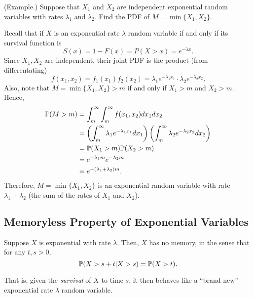 \documentclass[letterpaper]{article}
\begin{document}
\begin{mdframed}[]
    (Example.) Suppose that $X_1$ and $X_2$ are independent exponential random variables with rates $\lambda_1$ and $\lambda_2$. Find the PDF of $M = \min\{X_1, X_2\}$. 

    \begin{mdframed}[]
        Recall that if $X$ is an exponential rate $\lambda$ random variable if and only if its survival function is 
        \[S(x) = 1 - F(x) = P(X > x) = e^{-\lambda x}.\]
        Since $X_1, X_2$ are independent, their joint PDF is the product (from differentating)
        \[f(x_1, x_2) = f_{1}(x_1) f_{2}(x_2) = \lambda_1 e^{-\lambda_1 x_1} \cdot \lambda_2 e^{-\lambda_2 x_2}.\]
        Also, note that $M = \min\{X_1, X_2\} > m$ if and only if $X_1 > m$ and $X_2 > m$. Hence,
        \begin{equation*}
            \begin{aligned}
                \mathbb{P}(M > m) &= \int_{m}^{\infty} \int_{m}^{\infty} f(x_1, x_2) dx_1 dx_2 \\ 
                    &= \left(\int_{m}^{\infty} \lambda_1 e^{-\lambda_1 x_1} dx_1\right) \left(\int_{m}^{\infty} \lambda_2 e^{-\lambda_2 x_2} dx_2\right) \\ 
                    &= \mathbb{P}(X_1 > m) \mathbb{P}(X_2 > m) \\ 
                    &= e^{-\lambda_1 m} e^{-\lambda_2 m} \\ 
                    &= e^{-(\lambda_1 + \lambda_2)m}.
            \end{aligned}
        \end{equation*}
        Therefore, $M = \min\{X_1, X_2\}$ is an exponential random variable with rate $\lambda_1 + \lambda_2$ (the sum of the rates of $X_1$ and $X_2$). 
    \end{mdframed}
\end{mdframed}

\subsection{Memoryless Property of Exponential Variables}
\begin{theorem}{}{}
    Suppose $X$ is exponential with rate $\lambda$. Then, $X$ has no memory, in the sense that for any $t, s > 0$, 
    \[\mathbb{P}(X > s + t | X > s) = \mathbb{P}(X > t).\]
\end{theorem}
That is, given the \emph{survival} of $X$ to time $s$, it then behaves like a ``brand new'' exponential rate $\lambda$ random variable. 
\end{document}

